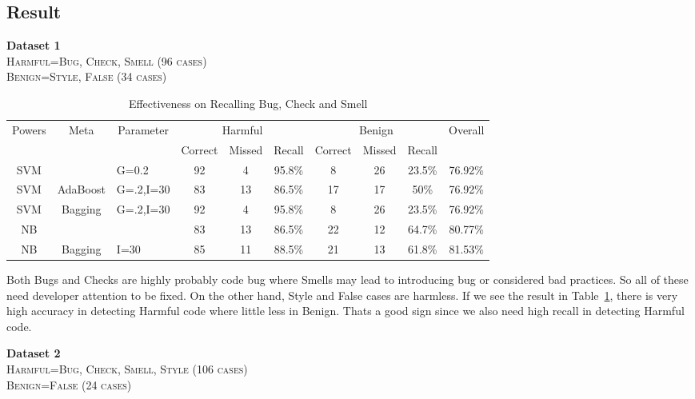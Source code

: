 \documentclass[11pt]{article}
\begin{document}
\subsection{Result}
\textbf{Dataset 1}\\
\textsc{Harmful=Bug, Check, Smell (96 cases)}\\
\textsc{Benign=Style, False (34 cases)}\\

\begin{table}[h!]
\centering
\begin{tabular*}{1.025\textwidth}{|c|c| p{.1in} |c|c|c|c|c|c|c|}
\hline
\multicolumn{1}{|c|}{\multirow{2}{*}{Powers}} & 
\multicolumn{1}{|c|}{\multirow{2}{*}{Meta}} & 
\multicolumn{1}{|c|}{\multirow{2}{*}{Parameter}} & 
\multicolumn{3}{|c|}{Harmful} & 
\multicolumn{3}{|c|}{Benign} & 
\multicolumn{1}{|c|}{\multirow{2}{*}{Overall}} \\
\cline{4-9}

& & & Correct & Missed & Recall & Correct & Missed & Recall & \\
\hline

SVM & & G=0.2 & 92 & 4 & 95.8\% & 8 & 26 & 23.5\% & 76.92\% \\
\hline
SVM & AdaBoost & G=.2,I=30 & 83 & 13 & 86.5\% & 17 & 17 & 50\% & 76.92\% \\
\hline
SVM	& Bagging& G=.2,I=30  & 92 & 4 & 95.8\% & 8 & 26 & 23.5\% & 76.92\% \\
\hline
NB & & & 83 & 13 & 86.5\% & 22 & 12 & 64.7\% & 80.77\% \\
\hline
NB & Bagging & I=30 & 85 & 11 & 88.5\% & 21 & 13 & 61.8\% & 81.53\% \\
\hline
\end{tabular*}
\caption{Effectiveness on Recalling Bug, Check and Smell}
\label{tab:dataset1}
\end{table}


\noindent
Both Bugs and Checks are highly probably code bug where Smells may lead to introducing bug or considered bad practices. So all of these need developer attention to be fixed. On the other hand, Style and False cases are harmless. If we see the result in Table~\ref{tab:dataset1}, there is very high accuracy in detecting Harmful code where little less in Benign. Thats a good sign since we also need high recall in detecting Harmful code.

\vspace{10 pt}
\noindent
\textbf{Dataset 2}\\
\textsc{Harmful=Bug, Check, Smell, Style (106 cases)}\\
\textsc{Benign=False (24 cases)}\\
\end{document}
